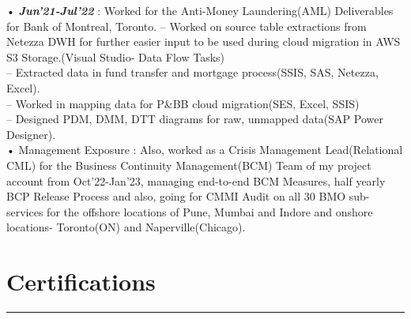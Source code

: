 \documentclass[]{DD_Resume_23}
\begin{document}
\begin{minipage}[t]{0.66\textwidth}
\begin{minipage}{0.85\textwidth\vspace{2pt}}
• \textbf{\textit{Jun'21-Jul'22}} : Worked for the Anti-Money Laundering(AML) Deliverables for Bank of Montreal, Toronto.
-- Worked on source table extractions from Netezza DWH for further easier input to be used during cloud migration in AWS S3 Storage.(Visual Studio- Data Flow Tasks)\\
-- Extracted data in fund transfer and mortgage process(SSIS, SAS, Netezza, Excel).\\
-- Worked in mapping data for P&BB cloud migration(SES, Excel, SSIS)\\
-- Designed PDM, DMM, DTT diagrams for raw, unmapped data(SAP Power Designer).\\
  
• Management Exposure : Also, worked as a Crisis Management Lead(Relational CML) for the Business Continuity Management(BCM) Team of my project account from Oct'22-Jan'23, managing end-to-end BCM Measures, half yearly BCP Release Process and also, going for CMMI Audit on all 30 BMO sub-services for the offshore locations of Pune, Mumbai and Indore and onshore locations- Toronto(ON) and Naperville(Chicago).\\

\end{minipage}
\sectionsep
\section{Certifications} 
\noindent\rule{12.5cm}{0.4pt}
 
\noindent
\hspace{5em}%
 
\noindent
\hspace{5em}%
\hspace{5em}%
 
\noindent
\hspace{5em}%


\end{minipage} 
\end{document}
